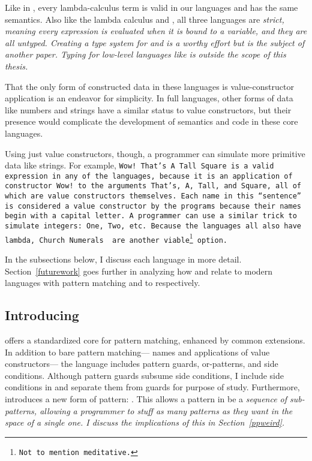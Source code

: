 \documentclass[manuscript,screen,review, 12pt, nonacm]{acmart}
\begin{document}
    Like in \VC, every lambda-calculus term is valid in our languages and has
    the same semantics. Also like the lambda calculus and \VC, all three
    languages are \it{strict}, meaning every expression is evaluated when it is
    bound to a variable, and they are all untyped. Creating a type system for
    \PPlus and \VMinus is a worthy effort but is the subject of another paper.
    Typing for low-level languages like \D is outside the scope of this thesis. 
    
    That the only form of constructed data in these languages is
    value-constructor application is an endeavor for simplicity. In full
    languages, other forms of data like numbers and strings have a similar
    status to value constructors, but their presence would complicate the
    development of semantics and code in these core languages. 
    
    Using just value constructors, though, a programmer can simulate more
    primitive data like strings. For example, \tt{Wow! That's A Tall Square} is
    a valid expression in any of the languages, because it is an application of
    constructor \tt{Wow!} to the arguments \tt{That's}, \tt{A}, \tt{Tall}, and
    \tt{Square}, all of which are value constructors themselves. Each name in
    this “sentence” is considered a value constructor by the programs because
    their names begin with a capital letter. A programmer can use a similar
    trick to simulate integers: \tt{One}, \tt{Two}, etc. Because the languages
    all also have lambda, Church Numerals~\citep{church1985calculi} are another
    viable\footnote{Not to mention meditative.} option. 

    In the subsections below, I discuss each language in more detail.
    Section~\ref{futurework} goes further in analyzing how \PPlus and \VMinus
    relate to modern languages with pattern matching and to \VC respectively. 


\subsection{Introducing \PPlus}
\label{pplus}

    \PPlus offers a standardized core for pattern matching, enhanced by common
    extensions. In addition to bare pattern matching— names and applications of
    value constructors— the language includes pattern guards, or-patterns, and
    side conditions. Although pattern guards subsume side conditions, I include
    side conditions in \PPlus and separate them from guards for purpose of
    study. Furthermore, \PPlus introduces a new form of pattern: \pcommap. This
    allows a pattern in \PPlus be a \it{sequence} of sub-patterns, allowing a
    programmer to stuff as many patterns as they want in the space of a single
    one. I discuss the implications of this in Section~\ref{ppweird}.
\end{document}
